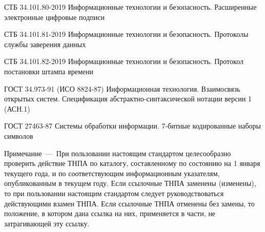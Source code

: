 СТБ 34.101.80-2019 
Информационные технологии и безопасность. 
Расширенные электронные цифровые подписи

СТБ 34.101.81-2019 
Информационные технологии и безопасность. 
Протоколы службы заверения данных

СТБ 34.101.82-2019 
Информационные технологии и безопасность. 
Протокол постановки штампа времени

ГОСТ 34.973-91 (ИСО 8824-87) Информационная технология. Взаимосвязь 
открытых систем. Спецификация абстрактно-синтаксической нотации версии 1 
(АСН.1) 

ГОСТ 27463-87 Системы обработки информации. 
7-битные кодированные наборы символов

\begin{note}
Примечание~---~При пользовании настоящим стандартом
целесообразно проверить действие ТНПА 
по каталогу, составленному по состоянию на 1 января текущего
года, и по соответствующим информационным указателям, опубликованным
в текущем году. Если ссылочные ТНПА заменены (изменены), то при
пользовании настоящим стандартом следует руководствоваться
действующими взамен ТНПА. Если ссылочные ТНПА отменены без
замены, то положение, в котором дана ссылка на них, применяется в
части, не затрагивающей эту ссылку.
\end{note}
